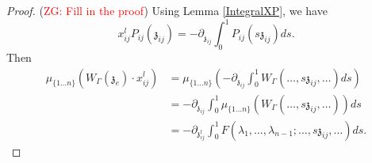 \documentclass[11pt]{amsart}
\theoremstyle{definition}
\theoremstyle{remark}
\numberwithin{equation}{section}
\newcommand{\Gui}[1]{(\textcolor{red}{ZG: #1})}
\begin{document}
\begin{proof}
\Gui{Fill in the proof}
Using Lemma \ref{IntegralXP}, we have
$$
x^l_{ij}P_{ij}(\mathfrak{z}_{ij})=-\partial_{\mathfrak{z}_{ij}}\int^1_0P_{ij}(s\mathfrak{z}_{ij})ds.
$$
Then
\begin{align*}
   \mu_{\{1\dots n\}}\left(W_{\Gamma}(\mathfrak{z}_{e})\cdot x^l_{ij}\right)  &=\mu_{\{1\dots n\}}\left(-\partial_{\mathfrak{z}_{ij}}\int^1_0W_{\Gamma}(\dots,s\mathfrak{z}_{ij},\dots)ds\right)  \\
   & =-\partial_{\mathfrak{z}_{ij}}\int^1_0\mu_{\{1\dots n\}}\left(W_{\Gamma}(\dots,s\mathfrak{z}_{ij},\dots)\right)ds\\
   &=-\partial_{\mathfrak{z}^l_{ij}}\int^1_0F(\lambda_1,\dots,\lambda_{n-1};\dots,s\mathfrak{z}_{ij},\dots)ds.
\end{align*}
\end{proof}
\end{document}
